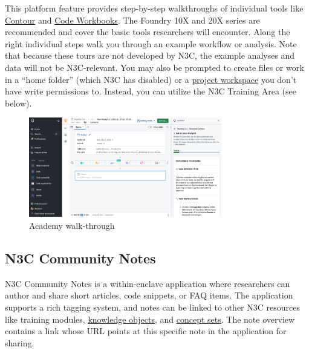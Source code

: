 \documentclass[
  letterpaper,
  DIV=11,
  numbers=noendperiod]{scrreprt}
\begin{document}
This platform feature provides step-by-step walkthroughs of individual
tools like \protect\hyperlink{contour}{Contour} and
\protect\hyperlink{code-workbooks}{Code Workbooks}. The Foundry 10X and
20X series are recommended and cover the basic tools researchers will
encounter. Along the right individual steps walk you through an example
workflow or analysis. Note that because these tours are not developed by
N3C, the example analyses and data will not be N3C-relevant. You may
also be prompted to create files or work in a ``home folder'' (which N3C
has disabled) or a \protect\hyperlink{project-workspaces}{project
workspace} you don't have write permissions to. Instead, you can utilize
the N3C Training Area (see below).

\begin{figure}

{\centering \includegraphics[width=0.75\textwidth,height=\textheight]{chapters/images/support/image-15-academy.png}

}

\caption{\label{fig-support-academy}Academy walk-through}

\end{figure}

\hypertarget{sec-support-training-community}{%
\subsection{N3C Community Notes}\label{sec-support-training-community}}

N3C Community Notes is a within-enclave application where researchers
can author and share short articles, code snippets, or FAQ items. The
application supports a rich tagging system, and notes can be linked to
other N3C resources like training modules,
\protect\hyperlink{knowledge-objects}{knowledge objects}, and
\protect\hyperlink{concept-sets}{concept sets}. The note overview
contains a link whose URL points at this specific note in the
application for sharing.
\end{document}
